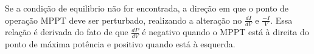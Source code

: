 \noindent
\begin{minipage}{\linewidth}
\label{CI_flux_fig}
\end{minipage}

Se a condição de equilibrio não for encontrada, a direção em que o ponto de operação MPPT deve ser perturbado, realizando a alteração no $\frac{dI}{dV}$ e $\frac{-I}{V}$. Essa relação é derivada do fato de que $\frac{dP}{dV}$ é negativo quando o MPPT está à direita do ponto de máxima potência e positivo quando está à esquerda.



